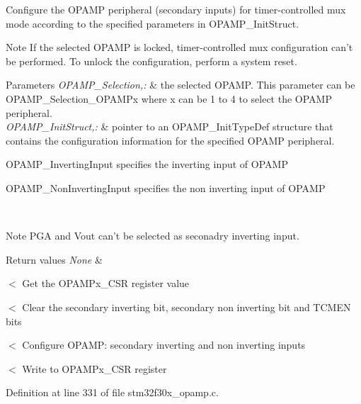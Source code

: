 Configure the O\-P\-A\-M\-P peripheral (secondary inputs) for timer-\/controlled mux mode according to the specified parameters in O\-P\-A\-M\-P\-\_\-\-Init\-Struct. 

\begin{DoxyNote}{Note}
If the selected O\-P\-A\-M\-P is locked, timer-\/controlled mux configuration can't be performed. To unlock the configuration, perform a system reset. 
\end{DoxyNote}

\begin{DoxyParams}{Parameters}
{\em O\-P\-A\-M\-P\-\_\-\-Selection,\-:} & the selected O\-P\-A\-M\-P. This parameter can be O\-P\-A\-M\-P\-\_\-\-Selection\-\_\-\-O\-P\-A\-M\-Px where x can be 1 to 4 to select the O\-P\-A\-M\-P peripheral. \\
\hline
{\em O\-P\-A\-M\-P\-\_\-\-Init\-Struct,\-:} & pointer to an O\-P\-A\-M\-P\-\_\-\-Init\-Type\-Def structure that contains the configuration information for the specified O\-P\-A\-M\-P peripheral.
\begin{DoxyItemize}
\item O\-P\-A\-M\-P\-\_\-\-Inverting\-Input specifies the inverting input of O\-P\-A\-M\-P
\item O\-P\-A\-M\-P\-\_\-\-Non\-Inverting\-Input specifies the non inverting input of O\-P\-A\-M\-P 
\end{DoxyItemize}\\
\hline
\end{DoxyParams}
\begin{DoxyNote}{Note}
P\-G\-A and Vout can't be selected as seconadry inverting input. 
\end{DoxyNote}

\begin{DoxyRetVals}{Return values}
{\em None} & \\
\hline
\end{DoxyRetVals}
$<$ Get the O\-P\-A\-M\-Px\-\_\-\-C\-S\-R register value

$<$ Clear the secondary inverting bit, secondary non inverting bit and T\-C\-M\-E\-N bits

$<$ Configure O\-P\-A\-M\-P\-: secondary inverting and non inverting inputs

$<$ Write to O\-P\-A\-M\-Px\-\_\-\-C\-S\-R register 

Definition at line 331 of file stm32f30x\-\_\-opamp.\-c.

